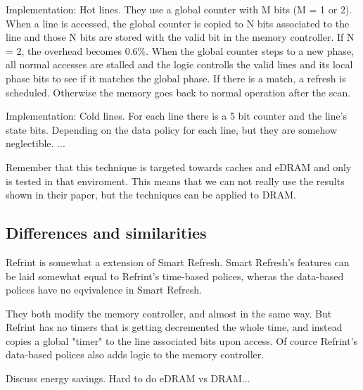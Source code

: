 Implementation: Hot lines. They use a global counter with M bits (M = 1 or 2). When a line is accessed, the global counter is copied to N bits associated to the line and those N bits are stored with the valid bit in the memory controller. If N = 2, the overhead becomes 0.6\%. When the global counter steps to a new phase, all normal accesses are stalled and the logic controlls the valid lines and its local phase bits to see if it matches the global phase. If there is a match, a refresh is scheduled. Otherwise the memory goes back to normal operation after the scan. 

Implementation: Cold lines. For each line there is a 5 bit counter and the line's state bits. Depending on the data policy  for each line, but they are somehow neglectible.  ...

Remember that this technique is targeted towards caches and eDRAM and only is tested in that enviroment. This means that we can not really use the results shown in their paper, but the techniques can be applied to DRAM.

\subsection{Differences and similarities}

Refrint is somewhat a extension of Smart Refresh. Smart Refresh's features can be laid somewhat equal to Refrint's time-based polices, wheras the data-based polices have no eqvivalence in Smart Refresh.

They both modify the memory controller, and almost in the same way. But Refrint has no timers that is getting decremented the whole time, and instead copies a global "timer" to the line associated bits upon access. Of cource Refrint's data-based polices also adds logic to the memory controller.

Discuss energy savings. Hard to do eDRAM vs DRAM...

